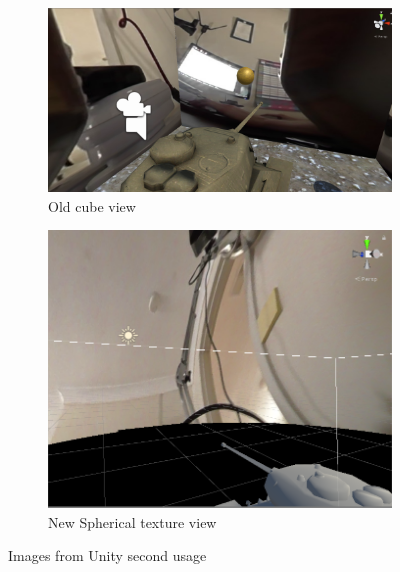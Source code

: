 \begin{figure}[H]
	\centering
	\begin{subfigure}[b]{0.4\textwidth}
		\includegraphics[width=\linewidth]{project/images/scene2.PNG}
		\caption{Old cube view}
		\label{fig:oldLook}
	\end{subfigure}	
	\begin{subfigure}[b]{0.24\textwidth}
		\includegraphics[width=\linewidth]{project/images/newLook1.PNG}
		\caption{New Spherical texture view}
		\label{fig:newLook}
	\end{subfigure}
	\caption{Images from Unity second usage}\label{fig:scene-developemt}
\end{figure}

